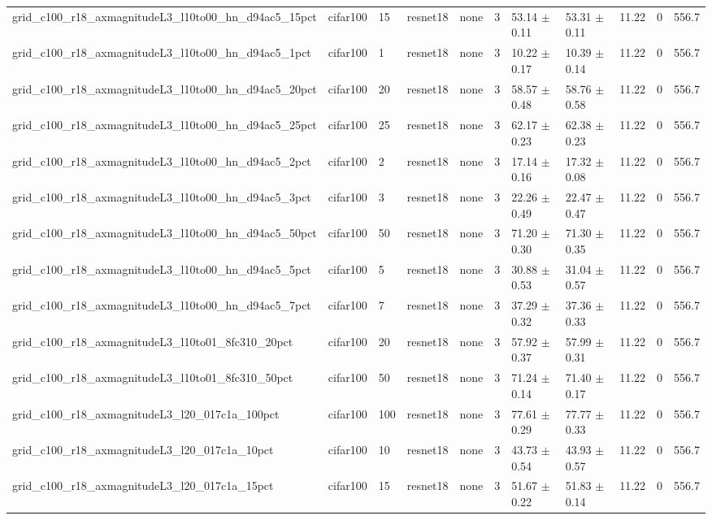 \begin{tabular}{lllllllllll}
grid_c100_r18_axmagnitudeL3_l10to00_hn_d94ac5_15pct & cifar100 & 15 & resnet18 & none & 3 & 53.14 $\pm$ 0.11 & 53.31 $\pm$ 0.11 & 11.22 & 0 & 556.7 \\
grid_c100_r18_axmagnitudeL3_l10to00_hn_d94ac5_1pct & cifar100 & 1 & resnet18 & none & 3 & 10.22 $\pm$ 0.17 & 10.39 $\pm$ 0.14 & 11.22 & 0 & 556.7 \\
grid_c100_r18_axmagnitudeL3_l10to00_hn_d94ac5_20pct & cifar100 & 20 & resnet18 & none & 3 & 58.57 $\pm$ 0.48 & 58.76 $\pm$ 0.58 & 11.22 & 0 & 556.7 \\
grid_c100_r18_axmagnitudeL3_l10to00_hn_d94ac5_25pct & cifar100 & 25 & resnet18 & none & 3 & 62.17 $\pm$ 0.23 & 62.38 $\pm$ 0.23 & 11.22 & 0 & 556.7 \\
grid_c100_r18_axmagnitudeL3_l10to00_hn_d94ac5_2pct & cifar100 & 2 & resnet18 & none & 3 & 17.14 $\pm$ 0.16 & 17.32 $\pm$ 0.08 & 11.22 & 0 & 556.7 \\
grid_c100_r18_axmagnitudeL3_l10to00_hn_d94ac5_3pct & cifar100 & 3 & resnet18 & none & 3 & 22.26 $\pm$ 0.49 & 22.47 $\pm$ 0.47 & 11.22 & 0 & 556.7 \\
grid_c100_r18_axmagnitudeL3_l10to00_hn_d94ac5_50pct & cifar100 & 50 & resnet18 & none & 3 & 71.20 $\pm$ 0.30 & 71.30 $\pm$ 0.35 & 11.22 & 0 & 556.7 \\
grid_c100_r18_axmagnitudeL3_l10to00_hn_d94ac5_5pct & cifar100 & 5 & resnet18 & none & 3 & 30.88 $\pm$ 0.53 & 31.04 $\pm$ 0.57 & 11.22 & 0 & 556.7 \\
grid_c100_r18_axmagnitudeL3_l10to00_hn_d94ac5_7pct & cifar100 & 7 & resnet18 & none & 3 & 37.29 $\pm$ 0.32 & 37.36 $\pm$ 0.33 & 11.22 & 0 & 556.7 \\
grid_c100_r18_axmagnitudeL3_l10to01_8fc310_20pct & cifar100 & 20 & resnet18 & none & 3 & 57.92 $\pm$ 0.37 & 57.99 $\pm$ 0.31 & 11.22 & 0 & 556.7 \\
grid_c100_r18_axmagnitudeL3_l10to01_8fc310_50pct & cifar100 & 50 & resnet18 & none & 3 & 71.24 $\pm$ 0.14 & 71.40 $\pm$ 0.17 & 11.22 & 0 & 556.7 \\
grid_c100_r18_axmagnitudeL3_l20_017c1a_100pct & cifar100 & 100 & resnet18 & none & 3 & 77.61 $\pm$ 0.29 & 77.77 $\pm$ 0.33 & 11.22 & 0 & 556.7 \\
grid_c100_r18_axmagnitudeL3_l20_017c1a_10pct & cifar100 & 10 & resnet18 & none & 3 & 43.73 $\pm$ 0.54 & 43.93 $\pm$ 0.57 & 11.22 & 0 & 556.7 \\
grid_c100_r18_axmagnitudeL3_l20_017c1a_15pct & cifar100 & 15 & resnet18 & none & 3 & 51.67 $\pm$ 0.22 & 51.83 $\pm$ 0.14 & 11.22 & 0 & 556.7 \\

\end{tabular}
